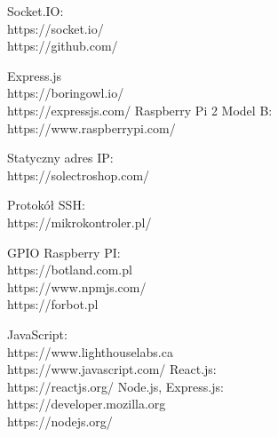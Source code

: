 \begin{thebibliography}{1}
 Socket.IO:
\\
https://socket.io/
\\
https://github.com/

 Express.js
\\ 
https://boringowl.io/
\\
https://expressjs.com/
Raspberry Pi 2 Model B:
\\
https://www.raspberrypi.com/

 Statyczny adres IP:
\\
https://solectroshop.com/

 Protokół SSH:
\\
https://mikrokontroler.pl/

 GPIO Raspberry PI:
\\
https://botland.com.pl
\\
https://www.npmjs.com/
\\
https://forbot.pl

 JavaScript:
\\
https://www.lighthouselabs.ca
\\
https://www.javascript.com/
React.js:
\\
https://reactjs.org/
Node.js, Express.js:
\\
https://developer.mozilla.org
\\
https://nodejs.org/

\end{thebibliography}


